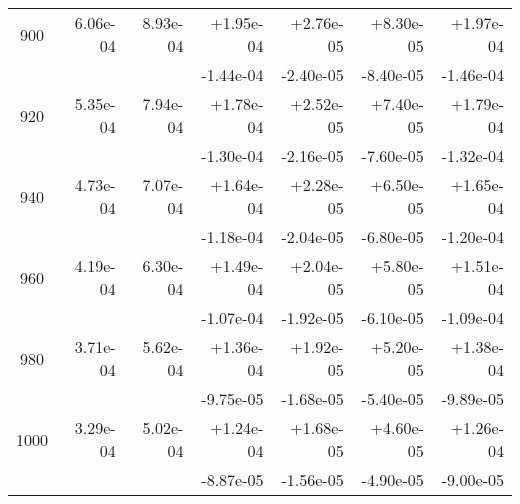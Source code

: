 \begin{tabular}{|c|r|r|r|r|r|r|}
\hline
900 & 6.06e-04 & 8.93e-04 & +1.95e-04 & +2.76e-05 & +8.30e-05 & +1.97e-04 \\
 & & & -1.44e-04 & -2.40e-05 & -8.40e-05 & -1.46e-04 \\
\hline
920 & 5.35e-04 & 7.94e-04 & +1.78e-04 & +2.52e-05 & +7.40e-05 & +1.79e-04 \\
 & & & -1.30e-04 & -2.16e-05 & -7.60e-05 & -1.32e-04 \\
\hline
940 & 4.73e-04 & 7.07e-04 & +1.64e-04 & +2.28e-05 & +6.50e-05 & +1.65e-04 \\
 & & & -1.18e-04 & -2.04e-05 & -6.80e-05 & -1.20e-04 \\
\hline
960 & 4.19e-04 & 6.30e-04 & +1.49e-04 & +2.04e-05 & +5.80e-05 & +1.51e-04 \\
 & & & -1.07e-04 & -1.92e-05 & -6.10e-05 & -1.09e-04 \\
\hline
980 & 3.71e-04 & 5.62e-04 & +1.36e-04 & +1.92e-05 & +5.20e-05 & +1.38e-04 \\
 & & & -9.75e-05 & -1.68e-05 & -5.40e-05 & -9.89e-05 \\
\hline
1000 & 3.29e-04 & 5.02e-04 & +1.24e-04 & +1.68e-05 & +4.60e-05 & +1.26e-04 \\
 & & & -8.87e-05 & -1.56e-05 & -4.90e-05 & -9.00e-05 \\
\hline
\end{tabular}

